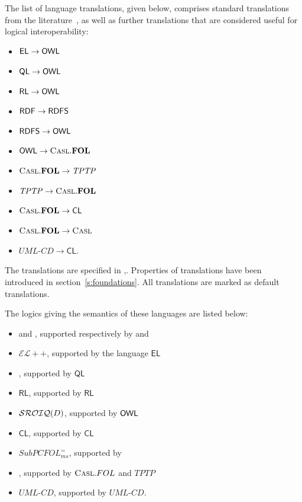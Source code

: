 \documentclass[10pt, a4paper]{isov2}
\makeatletter
\newcommand*\CommentAuthor{}
\renewcommand*\CommentAuthor{#1}}
\newcommand*\CommentDate{}
\renewcommand*\CommentDate{#1}}
\newcommand*\CommentId{}
\renewcommand*\CommentId{#1}}
\newcommand*\CommentType{}
\renewcommand*\CommentType{#1}}
\newcommand*{\SetCommentColorByType}[1]{%
\edef\localType{{#1}}%
\expandafter\ifstrequal\localType{q-aut}{\colorlet{CommentColor}{red}}{%
\expandafter\ifstrequal\localType{q-all}{\colorlet{CommentColor}{orange}}{%
\expandafter\ifstrequal\localType{todo}{\colorlet{CommentColor}{orange}}{%
\expandafter\ifstrequal\localType{fyi}{\colorlet{CommentColor}{lightgray}}{%
\colorlet{CommentColor}{yellow}}}}}}
\newcommand*{\SetCommentPrefixByType}[1]{%
\edef\localType{{#1}}%
\expandafter\@ifmtarg\localType{%
\edef\CommentPrefix{}%
}{%
\caseupper[q]{#1}%
\edef\CommentPrefix{\thestring: }%
}}
\newcommand*{\initComment}[1]{%
\setkeys{Comment}{#1}%
\SetCommentColorByType{\CommentType}%
\relax%
\SetCommentPrefixByType{\CommentType}%
\relax%
}
\newcommand*{\todonote}[2][]{%
\initComment{#1}%
\pdfcomment[author=\CommentAuthor,color=CommentColor,date=\CommentDate,id=\CommentId]{%
\CommentPrefix
#2}}
\renewcommand*{\todonote}[2][]{%
\initComment{#1}%
\ednote{\CommentPrefix #2}}
\newcommand*{\CL}{\ensuremath{\mathsf{CL}}\xspace}
\newcommand{\QL}{\ensuremath{\mathsf{QL}}\xspace}
\newcommand{\RL}{\ensuremath{\mathsf{RL}}\xspace}
\newcommand{\EL}{\ensuremath{\mathsf{EL}}\xspace}
\newcommand{\ELDL}{\ensuremath{\mathcal{EL}}\xspace}
\makeatother
\begin{document}
The list of language translations, given below, comprises standard
translations from the literature~\cite{OntoGraph,MossakowskiEtAl14b}, as
well as further translations that are considered useful for logical
interoperability:
\begin{itemize}
  \item $\EL \to \OWL$ 
  \item $\QL \to \OWL$
  \item $\RL \to \OWL$
  \item $\mathsf{RDF} \to \mathsf{RDFS}$
  \item $\mathsf{RDFS} \to \mathsf{OWL}$
  \item $\mathsf{OWL}  \to \textmd{\textsc{Casl}}.\mathbf{FOL}$
  \item $\textmd{\textsc{Casl}}.\mathbf{FOL} \to \mathit{TPTP}$
  \item $\mathit{TPTP} \to \textmd{\textsc{Casl}}.\mathbf{FOL}$
  \item $\CASL.\FOL \to \CL$
  \item $\textmd{\textsc{Casl}}.\mathbf{FOL} \to \textmd{\textsc{Casl}}$
  \item $\mathit{UML\textit{-}CD} \to \CL$.
\end{itemize}

The translations are specified in \cite{OntoGraph},\cite{MossakowskiEtAl14b}.
Properties of translations have been introduced in section~\ref{s:foundations}.
All translations are marked as default translations. 




The logics giving the semantics of these languages are listed below:
\begin{itemize}
 \item \RDF and \RDFS, supported respectively by \RDF and \RDFS
 \item $\ELDL{+}{+}$, supported by the language \EL
 \item \DLLiteR, supported by \QL
 \item \RL, supported by \RL
 \item $\mathcal{SROIQ}(D)$, supported by $\mathsf{OWL}$
 \item \CL, supported by \CL
 \item $SubPCFOL^=_{ms}$, supported by \CASL
 \item \FOL, supported by $\textmd{\textsc{Casl}}.FOL$ and $TPTP$
 \item $UML\mbox{-}CD$, supported by $UML\mbox{-}CD$.
\end{itemize}
\end{document}

